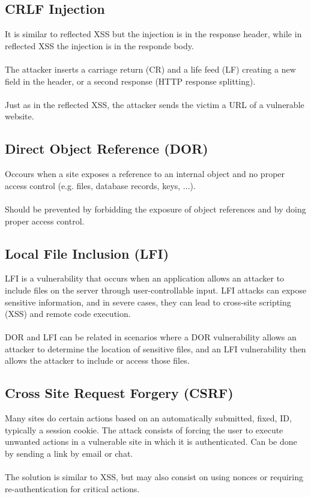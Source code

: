 \documentclass[10pt,a4paper]{report}
\begin{document}
\subsection{CRLF Injection}
It is similar to reflected XSS but the injection is in the response header, while in reflected XSS the injection is in the responde body.\\
\\
The attacker inserts a carriage return (CR) and a life feed (LF) creating a new field in the header, or a second response (HTTP response splitting).\\
\\
Just as in the reflected XSS, the attacker sends the victim a URL of a vulnerable website.
\subsection{Direct Object Reference (DOR)}
Occours when a site exposes a reference to an internal object and no proper access control (e.g. files, database records, keys, ...).\\
\\
Should be prevented by forbidding the exposure of object references and by doing proper access control.
\subsection{Local File Inclusion (LFI)}
LFI is a vulnerability that occurs when an application allows an attacker to include files on the server through user-controllable input. LFI attacks can expose sensitive information, and in severe cases, they can lead to cross-site scripting (XSS) and remote code execution.\\
\\
DOR and LFI can be related in scenarios where a DOR vulnerability allows an attacker to determine the location of sensitive files, and an LFI vulnerability then allows the attacker to include or access those files.
\subsection{Cross Site Request Forgery (CSRF)}
Many sites do certain actions based on an automatically submitted, fixed, ID, typically a session cookie. The attack consists of forcing the user to execute unwanted actions in a vulnerable site in which it is authenticated. Can be done by sending a link by email or chat.\\
\\
The solution is similar to XSS, but may also consist on using nonces or requiring re-authentication for critical actions.
\end{document}
